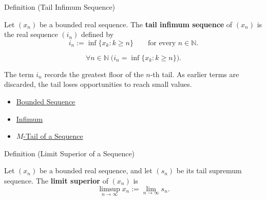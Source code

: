 
\begin{definitionbox}{Definition (Tail Infimum Sequence)}
\begin{definition}
\label{def:tail-infimum-sequence}
Let $(x_n)$ be a bounded real sequence. The \textbf{tail infimum
sequence} of $(x_n)$ is the real sequence $(i_n)$ defined by
\[
  i_n:=\inf\{x_k:k\ge n\}
  \qquad\text{for every } n\in\mathbb{N}.
\]
\end{definition}
\end{definitionbox}

\begin{remark*}
\[
\forall n\in\mathbb{N}\;
\bigl(i_n=\inf\{x_k:k\ge n\}\bigr).
\]
\end{remark*}

\begin{remark*}[Interpretation]
The term $i_n$ records the greatest floor of the $n$-th tail. As earlier
terms are discarded, the tail loses opportunities to reach small values.
\end{remark*}

\begin{dependencies}
\begin{itemize}
  \item \hyperref[def:bounded-sequence]{Bounded Sequence}
  \item \hyperref[def:infimum]{Infimum}
  \item \hyperref[def:m-tail]{$M$-Tail of a Sequence}
\end{itemize}
\end{dependencies}


\begin{definitionbox}{Definition (Limit Superior of a Sequence)}
\begin{definition}
\label{def:limsup-sequence}
Let $(x_n)$ be a bounded real sequence, and let $(s_n)$ be its tail
supremum sequence. The \textbf{limit superior} of $(x_n)$ is
\[
  \limsup_{n\to\infty}x_n:=\lim_{n\to\infty}s_n.
\]
\end{definition}
\end{definitionbox}

